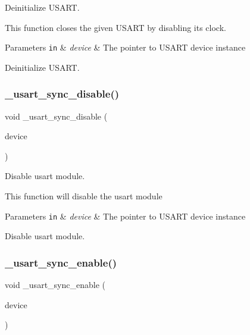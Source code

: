 Deinitialize U\+S\+A\+RT. 

This function closes the given U\+S\+A\+RT by disabling its clock.


\begin{DoxyParams}[1]{Parameters}
\mbox{\tt in}  & {\em device} & The pointer to U\+S\+A\+RT device instance\\
\hline
\end{DoxyParams}
Deinitialize U\+S\+A\+RT. \mbox{\label{group___h_p_l_gac021f29c77d8a9bfabfdd7433dbbb024}} 
\subsubsection{\texorpdfstring{\+\_\+usart\+\_\+sync\+\_\+disable()}{\_usart\_sync\_disable()}}
{\footnotesize\ttfamily void \+\_\+usart\+\_\+sync\+\_\+disable (\begin{DoxyParamCaption}\item[{struct \hyperlink{struct__usart__sync__device}{\+\_\+usart\+\_\+sync\+\_\+device} $\ast$const}]{device }\end{DoxyParamCaption})}



Disable usart module. 

This function will disable the usart module


\begin{DoxyParams}[1]{Parameters}
\mbox{\tt in}  & {\em device} & The pointer to U\+S\+A\+RT device instance\\
\hline
\end{DoxyParams}
Disable usart module. \mbox{\label{group___h_p_l_ga5ca07057bde212b46f6547e5bdb876de}} 
\subsubsection{\texorpdfstring{\+\_\+usart\+\_\+sync\+\_\+enable()}{\_usart\_sync\_enable()}}
{\footnotesize\ttfamily void \+\_\+usart\+\_\+sync\+\_\+enable (\begin{DoxyParamCaption}\item[{struct \hyperlink{struct__usart__sync__device}{\+\_\+usart\+\_\+sync\+\_\+device} $\ast$const}]{device }\end{DoxyParamCaption})}



